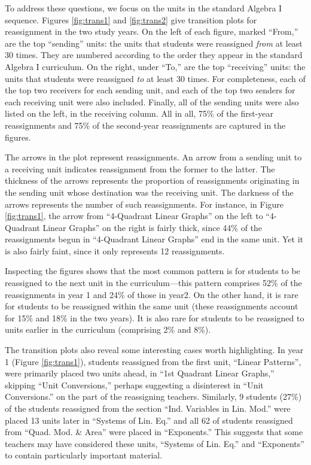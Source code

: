 \documentclass[12pt]{article}\usepackage[]{graphicx}\usepackage[]{color}
\begin{document}
To address these questions, we focus on the units in the standard
Algebra I sequence.
Figures \ref{fig:trans1} and \ref{fig:trans2} give transition plots
for reassignment in the two study years.
On the left of each figure, marked ``From,'' are the top ``sending''
units: the units that students were reassigned \emph{from} at least 30
times.
They are numbered according to the order they appear in the standard Algebra I curriculum.
On the right, under ``To,'' are the top ``receiving'' units: the units
that students were reassigned \emph{to} at least 30 times.
For completeness, each of the top two receivers for each sending unit,
and each of the top two senders for each receiving unit were also included.
Finally, all of the sending units were also listed on the left, in the
receiving column.
All in all, 75\% of the first-year reassignments and
75\% of the second-year reassignments are
captured in the figures.

The arrows in the plot represent reassignments.
An arrow from a sending unit to a receiving unit indicates
reassignment from the former to the latter.
The thickness of the arrows represents the proportion of reassignments
originating in the sending unit whose destination was the receiving unit.
The darkness of the arrows represents the number of such reassignments.
For instance, in Figure \ref{fig:trans1}, the arrow from
``4-Quadrant Linear Graphs'' on the left to ``4-Quadrant Linear
Graphs'' on the right is fairly thick, since
44\%
of the reassignments begun in ``4-Quadrant Linear Graphs'' end in the
same unit.
Yet it is also fairly faint, since it only represents
12
reassignments.

Inspecting the figures shows that the most common pattern is for
students to be reassigned to the next unit in the curriculum---this pattern comprises
52\% of the reassignments in year 1 and
24\% of those in year2.
On the other hand, it is rare for students to be reassigned within the same unit
(these reassignments account for 15\% and 18\% in the two years).
It is also rare for students to be reassigned to units earlier in the curriculum (comprising
2\% and
8\%).

The transition plots also reveal some interesting cases worth highlighting.
In year 1 (Figure \ref{fig:trans1}), students reassigned from the first unit, ``Linear Patterns'', were primarily placed two units ahead, in ``1st Quadrant Linear Graphs,'' skipping ``Unit Conversions,'' perhaps suggesting a disinterest in ``Unit Conversions.'' on the part of the reassigning teachers.
Similarly,
9 students
(27\%)
of the students reassigned from the section ``Ind. Variables in Lin. Mod.'' were placed 13 units later in ``Systems of Lin. Eq.''
and all 62 of students reassigned from ``Quad. Mod. \& Area'' were placed in ``Exponents.''
This suggests that some teachers may have considered these units, ``Systems of Lin. Eq.'' and ``Exponents'' to contain particularly important material.
\end{document}
